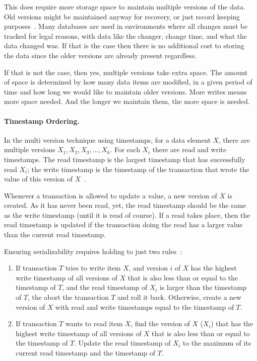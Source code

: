 This does require more storage space to maintain multiple versions of the data. Old versions might be maintained anyway for recovery, or just record keeping purposes~\cite{fds}. Many databases are used in environments where all changes must be tracked for legal reasons, with data like the changer, change time, and what the data changed was. If that is the case then there is no additional cost to storing the data since the older versions are already present regardless. 

If that is not the case, then yes, multiple versions take extra space. The amount of space is determined by how many data items are modified, in a given period of time and how long we would like to maintain older versions. More writes means more space needed. And the longer we maintain them, the more space is needed. 

\paragraph{Timestamp Ordering.} In the multi version technique using timestamps, for a data element $X$, there are multiple versions $X_{1}, X_{2}, X_{3}, ... , X_{k}$. For each $X_{i}$ there are read and write timestamps. The read timestamp is the largest timestamp that has successfully read $X_{i}$; the write timestamp is the timestamp of the transaction that wrote the value of this version of $X$~\cite{fds}. 

Whenever a transaction is allowed to update a value, a new version of $X$ is created. As it has never been read, yet, the read timestamp should be the same as the write timestamp (until it is read of course). If a read takes place, then the read timestamp is updated if the transaction doing the read has a larger value than the current read timestamp.

Ensuring serializability requires holding to just two rules~\cite{fds}:

\begin{enumerate}
	\item If transaction $T$ tries to write item $X$, and version $i$ of $X$ has the highest write timestamp of all versions of $X$ that is also less than or equal to the timestamp of $T$, and the read timestamp of $X_{i}$ is larger than the timestamp of $T$, the abort the transaction $T$ and roll it back. Otherwise, create a new version of $X$ with read and write timestamps equal to the timestamp of $T$.
	
	\item If transaction $T$ wants to read item $X$, find the version of $X$ ($X_{i}$) that has the highest write timestamp of all versions of $X$ that is also less than or equal to the timestamp of $T$. Update the read timestamp of $X_{i}$ to the maximum of its current read timestamp and the timestamp of $T$.
\end{enumerate}

